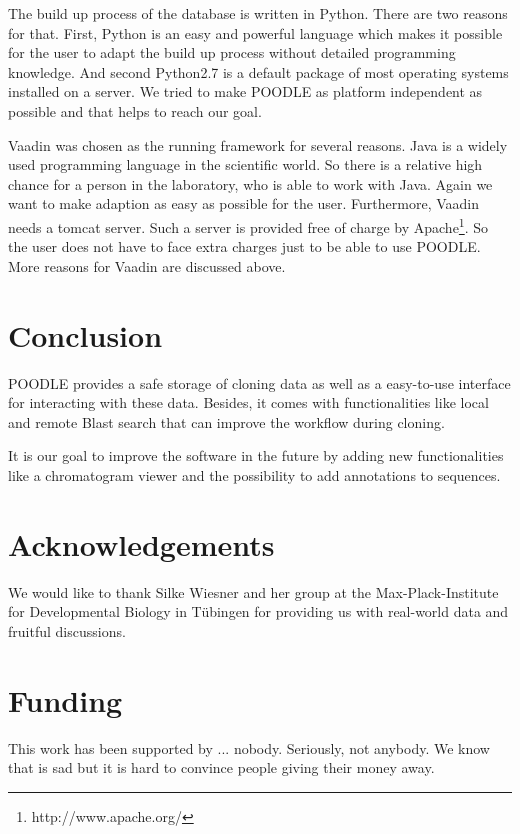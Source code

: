 \documentclass{bioinfo}
\begin{document}
The build up process of the database is written in Python. There are two reasons for that. First, 
Python is an easy and powerful language which makes it possible for the user to adapt the build up 
process without detailed programming knowledge. And second Python2.7 is a default package of most 
operating systems installed on a server. We tried to make POODLE as platform independent as possible 
and that helps to reach our goal.

Vaadin was chosen as the running framework for several reasons. Java is a widely used programming language 
in the scientific world. So there is a relative high chance for a person in the laboratory, who 
is able to work with
Java. Again we want to make adaption as easy as possible for the user. Furthermore, Vaadin needs a 
tomcat server. Such a server is provided free of charge by Apache\footnote{http://www.apache.org/}. 
So the user does not have to face extra charges just to be able to use POODLE. More reasons for 
Vaadin are discussed above.

\section{Conclusion}

POODLE provides a safe storage of cloning data as well as a easy-to-use interface for 
interacting with these data. Besides, it comes with functionalities like local and remote Blast 
search that can improve the workflow during cloning. 

It is our goal to improve the software in the future by adding new functionalities like a chromatogram 
viewer and the possibility to add annotations to sequences. 

\section*{Acknowledgements}

We would like to thank Silke Wiesner and her group at the Max-Plack-Institute for Developmental Biology 
in T\"{u}bingen for providing us with real-world data and fruitful discussions.

\section*{Funding}

This work has been supported by ... nobody. Seriously, not anybody. We know that is sad but it is hard 
to convince people giving their money away.
\end{document}
